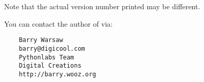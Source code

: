 \documentclass{howto}
\begin{document}
Note that the actual version number printed may be different.

You can contact the author of  via:

\begin{verbatim}
    Barry Warsaw
    barry@digicool.com
    Pythonlabs Team
    Digital Creations
    http://barry.wooz.org
\end{verbatim}



\end{document}
